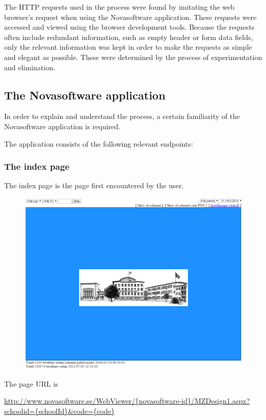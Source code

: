\documentclass{article}
\begin{document}
	The HTTP requests used in the process were found by imitating the web browser's request when using the Novasoftware application. These requests were accessed and viewed using the browser development tools. Because the requests often include redundant information, such as empty header or form data fields, only the relevant information was kept in order to make the requests as simple and elegant as possible. These were determined by the process of experimentation and elimination.
	
	\subsection{The Novasoftware application}
	In order to explain and understand the process, a certain familiarity of the Novasoftware application is required.
	
	The application consists of the following relevant endpoints:
	
	\subsubsection{The index page}
	The index page is the page first encountered by the user.
	
	\begin{figure}[h]
		\centering
		\includegraphics[width=0.9\linewidth]{images/index-page}
		\caption{}
		\label{fig:index-page}
	\end{figure}
	
	The page URL is
	
	\url{http://www.novasoftware.se/WebViewer/{novasoftware-id}/MZDesign1.aspx?schoolid={schoolId}&code={code}}
	
\end{document}

